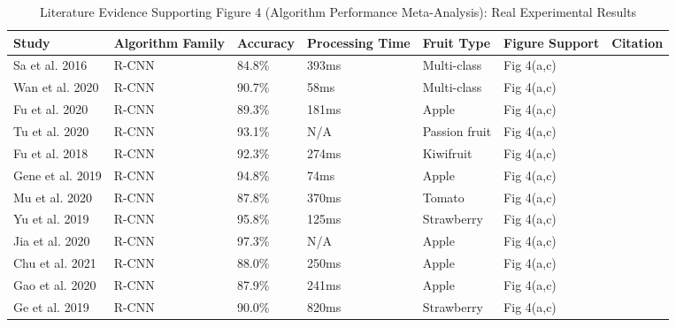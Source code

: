 \begin{table*}[htbp]
\centering
\small
\caption{Literature Evidence Supporting Figure 4 (Algorithm Performance Meta-Analysis): Real Experimental Results}
\label{tab:figure4_support}
\begin{tabular}{p{}p{}p{}p{}p{}p{}p{}}
\toprule
\textbf{Study} & \textbf{Algorithm Family} & \textbf{Accuracy} & \textbf{Processing Time} & \textbf{Fruit Type} & \textbf{Figure Support} & \textbf{Citation} \\ \midrule
Sa et al. 2016 & R-CNN & 84.8\% & 393ms & Multi-class & Fig 4(a,c) & \cite{sa2016deepfruits} \\
Wan et al. 2020 & R-CNN & 90.7\% & 58ms & Multi-class & Fig 4(a,c) & \cite{wan2020faster} \\
Fu et al. 2020 & R-CNN & 89.3\% & 181ms & Apple & Fig 4(a,c) & \cite{fu2020faster} \\
Tu et al. 2020 & R-CNN & 93.1\% & N/A & Passion fruit & Fig 4(a,c) & \cite{tu2020passion} \\
Fu et al. 2018 & R-CNN & 92.3\% & 274ms & Kiwifruit & Fig 4(a,c) & \cite{fu2018kiwifruit} \\
Gene et al. 2019 & R-CNN & 94.8\% & 74ms & Apple & Fig 4(a,c) & \cite{gene2019multi} \\
Mu et al. 2020 & R-CNN & 87.8\% & 370ms & Tomato & Fig 4(a,c) & \cite{mu2020intact} \\
Yu et al. 2019 & R-CNN & 95.8\% & 125ms & Strawberry & Fig 4(a,c) & \cite{yu2019fruit} \\
Jia et al. 2020 & R-CNN & 97.3\% & N/A & Apple & Fig 4(a,c) & \cite{jia2020detection} \\
Chu et al. 2021 & R-CNN & 88.0\% & 250ms & Apple & Fig 4(a,c) & \cite{chu2021deep} \\
Gao et al. 2020 & R-CNN & 87.9\% & 241ms & Apple & Fig 4(a,c) & \cite{gao2020multi} \\
Ge et al. 2019 & R-CNN & 90.0\% & 820ms & Strawberry & Fig 4(a,c) & \cite{ge2019fruit} \\
\bottomrule
\end{tabular}
\end{table*}

